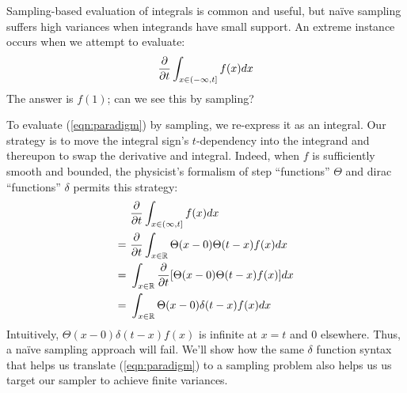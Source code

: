     Sampling-based evaluation of integrals is common and useful, but na\"ive
    sampling suffers high variances when integrands have small support.  An 
    extreme instance occurs when we attempt to evaluate:
    \begin{equation}\label{eqn:paradigm}
        \frac{\partial }{\partial t} \int_{x\in (-\infty,t]} f(x) dx 
    \end{equation}
    The answer is $f(1)$; can we see this by sampling?

    To evaluate (\ref{eqn:paradigm}) by sampling, we re-express it as an
    integral.  Our strategy is to move the integral sign's $t$-dependency into
    the integrand and thereupon to swap the derivative and integral.  Indeed,
    when $f$ is sufficiently smooth and bounded, the physicist's formalism of
    step ``functions'' $\Theta$ and dirac
    ``functions'' $\delta$ permits this strategy:
    \begin{align*}
        &~\frac{\partial }{\partial t} \int_{x\in (\infty,t]} f(x) dx 
        \\=
        &~\frac{\partial }{\partial t} \int_{x\in {\mathbb R}}
            \Theta(x-0)\Theta(t-x) f(x) dx 
        \\=
        &~\int_{x\in {\mathbb R}} \frac{\partial }{\partial t}
            [\Theta(x-0)\Theta(t-x) f(x)] dx 
        \\=
        &~\int_{x\in {\mathbb R}} 
            \Theta(x-0) \delta(t-x) f(x) dx 
    \end{align*}
    Intuitively, $\Theta(x-0) \delta(t-x) f(x)$ is infinite at $x=t$ and $0$
    elsewhere.  Thus, a na\"ive sampling approach will fail.  We'll show
    how the same $\delta$ function syntax that helps us translate
    (\ref{eqn:paradigm}) to a sampling problem also helps us us target our
    sampler to achieve finite variances.
